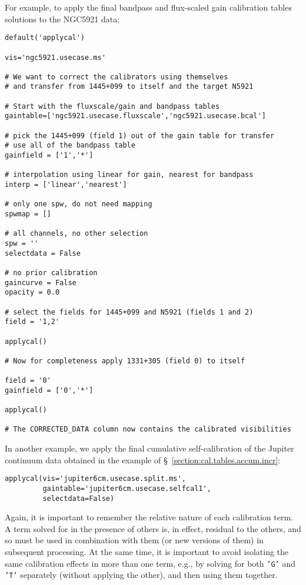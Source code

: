 For example, to apply the final bandpass and flux-scaled gain
calibration tables solutions to the NGC5921 data:
\small
\begin{verbatim}
default('applycal')

vis='ngc5921.usecase.ms'

# We want to correct the calibrators using themselves
# and transfer from 1445+099 to itself and the target N5921

# Start with the fluxscale/gain and bandpass tables
gaintable=['ngc5921.usecase.fluxscale','ngc5921.usecase.bcal']
         
# pick the 1445+099 (field 1) out of the gain table for transfer
# use all of the bandpass table
gainfield = ['1','*']

# interpolation using linear for gain, nearest for bandpass
interp = ['linear','nearest']

# only one spw, do not need mapping
spwmap = []

# all channels, no other selection
spw = ''
selectdata = False

# no prior calibration
gaincurve = False
opacity = 0.0

# select the fields for 1445+099 and N5921 (fields 1 and 2)
field = '1,2'

applycal()

# Now for completeness apply 1331+305 (field 0) to itself

field = '0'
gainfield = ['0','*']

applycal()

# The CORRECTED_DATA column now contains the calibrated visibilities
\end{verbatim}
\normalsize

In another example, we apply the final cumulative self-calibration 
of the Jupiter continuum data obtained in the example of
\S~\ref{section:cal.tables.accum.incr}:
\small
\begin{verbatim}
applycal(vis='jupiter6cm.usecase.split.ms',
         gaintable='jupiter6cm.usecase.selfcal1',
         selectdata=False)
\end{verbatim}
\normalsize

Again, it is important to remember the relative nature of each calibration
term.  A term solved for in the presence of others is, in effect,
residual to the others, and so must be used in combination with them
(or new versions of them) in subsequent processing.  At the same time,
it is important to avoid isolating the same calibration effects in
more than one term, e.g., by solving for both {\tt 'G'} and {\tt 'T'} 
separately (without applying the other), and then using them together.  

